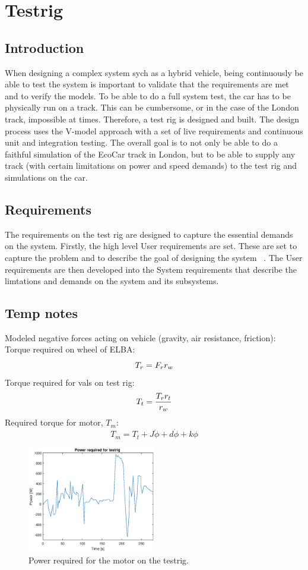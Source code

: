 \chapter{Testrig}
\section{Introduction}
When designing a complex system sych as a hybrid vehicle, being continuously be
able to test the system is important to validate that the requirements are met
and to verify the models. To be able to do a full system test, the car has to be
physically run on a track. This can be cumbersome, or in the case of the London
track, impossible at times. Therefore, a test rig is designed and built. The
design process uses the V-model approach with a set of live requirements and
continuous unit and integration testing. The overall goal is to not only be able
to do a faithful simulation of the EcoCar track in London, but to be able to
supply any track (with certain limitations on power and speed demands) to the
test rig and simulations on the car.

\section{Requirements}
The requirements on the test rig are designed to capture the essential demands
on the system. Firstly, the high level User requirements are set. These are set
to capture the problem and to describe the goal of designing the system
~\cite{ibm_req}. The User requirements are then developed into the System
requirements that describe the limtations and demands on the system and its
subsystems. 
\section{Temp notes}
Modeled negative forces acting on vehicle (gravity, air resistance, friction): 
Torque required on wheel of ELBA:$$T_r = F_r\*r_w$$
Torque required for vals on test rig: $$T_t = \frac{T_r\*r_t}{r_w}$$
Required torque for motor, $T_m$:
$$T_m = T_t + J\ddot{\phi} + d\dot{\phi} + k\phi$$


\begin{figure}[H]
    \centering
    \label{fig:testrig_power_required_motor}
    \includegraphics[width=0.5\textwidth]{./testrig/power_required_testrig.eps}
    \caption{Power required for the motor on the testrig.}
\end{figure}

